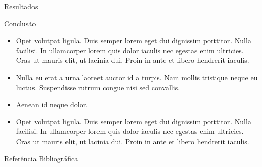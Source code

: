 \documentclass[final,hyperref={pdfpagelabels=false}]{beamer}
\begin{document}
\begin{frame}[t]
\begin{columns}[t]
\begin{column}{.465\textwidth}
\begin{block}{Resultados}
\end{block}


\begin{block}{Conclus\~ao}

\begin{itemize}
\item Opet volutpat ligula. Duis semper lorem eget dui dignissim porttitor. Nulla facilisi. In ullamcorper lorem quis dolor iaculis nec egestas enim ultricies. Cras ut mauris elit, ut lacinia dui. Proin in ante et libero hendrerit iaculis.
\item Nulla eu erat a urna laoreet auctor id a turpis. Nam mollis tristique neque eu luctus. Suspendisse rutrum congue nisi sed convallis. 
\item Aenean id neque dolor.
\item Opet volutpat ligula. Duis semper lorem eget dui dignissim porttitor. Nulla facilisi. In ullamcorper lorem quis dolor iaculis nec egestas enim ultricies. Cras ut mauris elit, ut lacinia dui. Proin in ante et libero hendrerit iaculis.
\end{itemize}

\end{block}


\begin{block}{Refer\^encia Bibliogr\'afica}
        
\nocite{*} %
\small{
}

\end{block}







\end{column}
\end{columns}
\end{frame}
\end{document}
